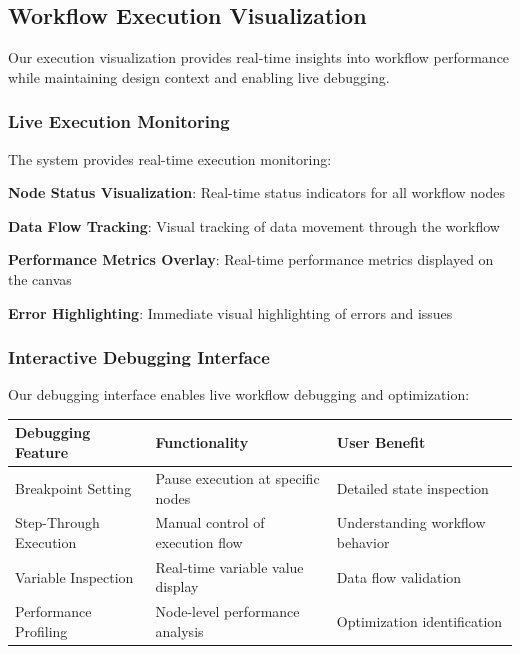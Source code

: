 \subsection*{Workflow Execution Visualization}

Our execution visualization provides real-time insights into workflow performance while maintaining design context and enabling live debugging.

\subsubsection*{Live Execution Monitoring}

The system provides real-time execution monitoring:

\begin{expandedlist}
    \item \textbf{Node Status Visualization}: Real-time status indicators for all workflow nodes
    \item \textbf{Data Flow Tracking}: Visual tracking of data movement through the workflow
    \item \textbf{Performance Metrics Overlay}: Real-time performance metrics displayed on the canvas
    \item \textbf{Error Highlighting}: Immediate visual highlighting of errors and issues
\end{expandedlist}

\subsubsection*{Interactive Debugging Interface}

Our debugging interface enables live workflow debugging and optimization:

\begin{center}
\begin{tabular}{@{}lll@{}}
\toprule
\textbf{Debugging Feature} & \textbf{Functionality} & \textbf{User Benefit} \\
\midrule
Breakpoint Setting & Pause execution at specific nodes & Detailed state inspection \\
Step-Through Execution & Manual control of execution flow & Understanding workflow behavior \\
Variable Inspection & Real-time variable value display & Data flow validation \\
Performance Profiling & Node-level performance analysis & Optimization identification \\
\bottomrule
\end{tabular}
\end{center}

